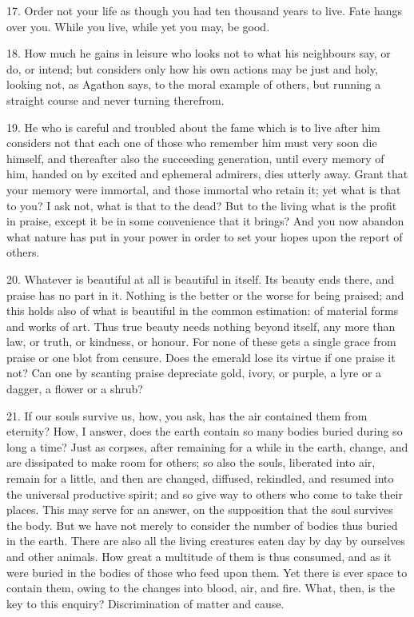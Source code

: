 \documentclass{book}
\begin{document}
17. Order not your life as though you had ten thousand years to
live. Fate hangs over you. While you live, while yet you may, be good.

18. How much he gains in leisure who looks not to what his neighbours
say, or do, or intend; but considers only how his own actions may be
just and holy, looking not, as Agathon says, to the moral example of
others, but running a straight course and never turning therefrom.

19. He who is careful and troubled about the fame which is to live
after him considers not that each one of those who remember him must
very soon die himself, and thereafter also the succeeding generation,
until every memory of him, handed on by excited and ephemeral
admirers, dies utterly away. Grant that your memory were immortal, and
those immortal who retain it; yet what is that to you? I ask not, what
is that to the dead? But to the living what is the profit in praise,
except it be in some convenience that it brings? And you now abandon
what nature has put in your power in order to set your hopes upon the
report of others.

20. Whatever is beautiful at all is beautiful in itself. Its beauty
ends there, and praise has no part in it. Nothing is the better or the
worse for being praised; and this holds also of what is beautiful in
the common estimation: of material forms and works of art. Thus true
beauty needs nothing beyond itself, any more than law, or truth, or
kindness, or honour. For none of these gets a single grace from praise
or one blot from censure. Does the emerald lose its virtue if one
praise it not? Can one by scanting praise depreciate gold, ivory, or
purple, a lyre or a dagger, a flower or a shrub?

21. If our souls survive us, how, you ask, has the air contained them
from eternity? How, I answer, does the earth contain so many bodies
buried during so long a time? Just as corpses, after remaining for a
while in the earth, change, and are dissipated to make room for
others; so also the souls, liberated into air, remain for a little,
and then are changed, diffused, rekindled, and resumed into the
universal productive spirit; and so give way to others who come to
take their places. This may serve for an answer, on the supposition
that the soul survives the body. But we have not merely to consider
the number of bodies thus buried in the earth. There are also all the
living creatures eaten day by day by ourselves and other animals. How
great a multitude of them is thus consumed, and as it were buried in
the bodies of those who feed upon them. Yet there is ever space to
contain them, owing to the changes into blood, air, and fire. What,
then, is the key to this enquiry? Discrimination of matter and cause.
\end{document}
